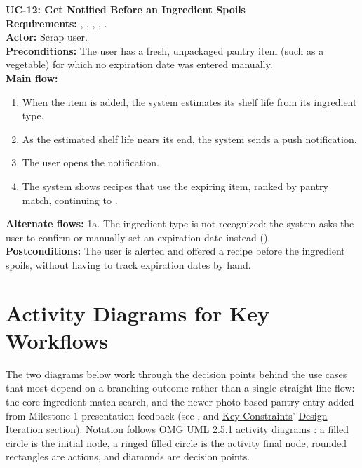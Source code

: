 \begin{sloppypar}
\medskip\noindent\textbf{UC-12: Get Notified Before an Ingredient Spoils}\\
\textbf{Requirements:} , , , , .\\
\textbf{Actor:} Scrap user.\\
\textbf{Preconditions:} The user has a fresh, unpackaged pantry item (such as a vegetable) for which no expiration date was entered manually.\\
\textbf{Main flow:}
\begin{enumerate}
\item When the item is added, the system estimates its shelf life from its ingredient type.
\item As the estimated shelf life nears its end, the system sends a push notification.
\item The user opens the notification.
\item The system shows recipes that use the expiring item, ranked by pantry match, continuing to .
\end{enumerate}
\textbf{Alternate flows:} 1a. The ingredient type is not recognized: the system asks the user to confirm or manually set an expiration date instead ().\\
\textbf{Postconditions:} The user is alerted and offered a recipe before the ingredient spoils, without having to track expiration dates by hand.
\end{sloppypar}

\section{Activity Diagrams for Key Workflows}

\noindent The two diagrams below work through the decision points behind the use cases that most depend on a branching outcome rather than a single straight-line flow: the core ingredient-match search, and the newer photo-based pantry entry added from Milestone 1 presentation feedback (see , and \hyperref[Chapter:KeyConstraints]{Key Constraints}' \hyperref[Section:DesignIteration]{Design Iteration} section). Notation follows OMG UML 2.5.1 activity diagrams \cite{OMGUML251}: a filled circle is the initial node, a ringed filled circle is the activity final node, rounded rectangles are actions, and diamonds are decision points.

